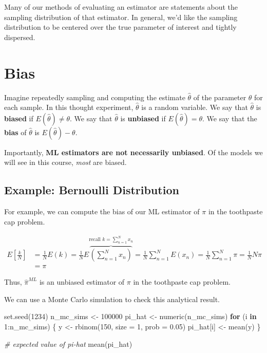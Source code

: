 \documentclass[
]{book}
\newenvironment{Shaded}{\begin{snugshade}}{\end{snugshade}}
\newcommand{\AttributeTok}[1]{\textcolor[rgb]{0.77,0.63,0.00}{#1}}
\newcommand{\CommentTok}[1]{\textcolor[rgb]{0.56,0.35,0.01}{\textit{#1}}}
\newcommand{\ControlFlowTok}[1]{\textcolor[rgb]{0.13,0.29,0.53}{\textbf{#1}}}
\newcommand{\DecValTok}[1]{\textcolor[rgb]{0.00,0.00,0.81}{#1}}
\newcommand{\FloatTok}[1]{\textcolor[rgb]{0.00,0.00,0.81}{#1}}
\newcommand{\FunctionTok}[1]{\textcolor[rgb]{0.00,0.00,0.00}{#1}}
\newcommand{\NormalTok}[1]{#1}
\newcommand{\OtherTok}[1]{\textcolor[rgb]{0.56,0.35,0.01}{#1}}
\newcommand{\SpecialCharTok}[1]{\textcolor[rgb]{0.00,0.00,0.00}{#1}}
\begin{document}
Many of our methods of evaluating an estimator are statements about the sampling distribution of that estimator. In general, we'd like the sampling distribution to be centered over the true parameter of interest and tightly dispersed.

\hypertarget{bias}{%
\section{Bias}\label{bias}}

Imagine repeatedly sampling and computing the estimate \(\hat{\theta}\) of the parameter \(\theta\) for each sample. In this thought experiment, \(\hat{\theta}\) is a random variable. We say that \(\hat{\theta}\) is \textbf{biased} if \(E(\hat{\theta}) \neq \theta\). We say that \(\hat{\theta}\) is \textbf{unbiased} if \(E(\hat{\theta}) = \theta\). We say that the \textbf{bias} of \(\hat{\theta}\) is \(E(\hat{\theta}) - \theta\).

Importantly, \textbf{ML estimators are not necessarily unbiased}. Of the models we will see in this course, \emph{most} are biased.

\hypertarget{example-bernoulli-distribution-1}{%
\subsection{Example: Bernoulli Distribution}\label{example-bernoulli-distribution-1}}

For example, we can compute the bias of our ML estimator of \(\pi\) in the toothpaste cap problem.

\[
\begin{aligned}
E\left[ \frac{k}{N}\right] &= \frac{1}{N} E(k) = \frac{1}{N} E  \overbrace{ \left( \sum_{n = 1}^N x_n \right) }^{\text{recall } k = \sum_{n = 1}^N x_n } = \frac{1}{N} \sum_{n = 1}^N E(x_n) = \frac{1}{N} \sum_{n = 1}^N \pi = \frac{1}{N}N\pi \\
&= \pi
\end{aligned}
\]

Thus, \(\hat{\pi}^{ML}\) is an unbiased estimator of \(\pi\) in the toothpaste cap problem.

We can use a Monte Carlo simulation to check this analytical result.

\begin{Shaded}
\begin{Highlighting}[]
\FunctionTok{set.seed}\NormalTok{(}\DecValTok{1234}\NormalTok{)}
\NormalTok{n\_mc\_sims }\OtherTok{\textless{}{-}} \DecValTok{100000}
\NormalTok{pi\_hat }\OtherTok{\textless{}{-}} \FunctionTok{numeric}\NormalTok{(n\_mc\_sims)}
\ControlFlowTok{for}\NormalTok{ (i }\ControlFlowTok{in} \DecValTok{1}\SpecialCharTok{:}\NormalTok{n\_mc\_sims) \{}
\NormalTok{  y }\OtherTok{\textless{}{-}} \FunctionTok{rbinom}\NormalTok{(}\DecValTok{150}\NormalTok{, }\AttributeTok{size =} \DecValTok{1}\NormalTok{, }\AttributeTok{prob =} \FloatTok{0.05}\NormalTok{)}
\NormalTok{  pi\_hat[i] }\OtherTok{\textless{}{-}} \FunctionTok{mean}\NormalTok{(y)}
\NormalTok{\}}

\CommentTok{\# expected value of pi{-}hat}
\FunctionTok{mean}\NormalTok{(pi\_hat)}
\end{Highlighting}
\end{Shaded}
\end{document}
